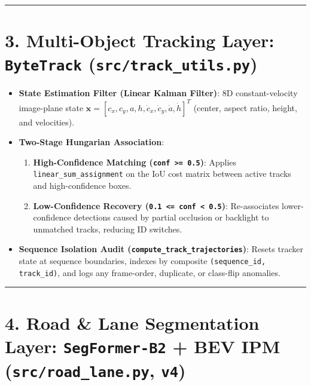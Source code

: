 \documentclass[10.5pt,a4paper]{article}
\begin{document}
\par\noindent\rule{\textwidth}{0.4pt}\par\medskip

\section{3. Multi-Object Tracking Layer: \texttt{ByteTrack} (\texttt{src/\allowbreak{}track\_\allowbreak{}utils.\allowbreak{}py})}

\begin{itemize}[leftmargin=1.5em,itemsep=2pt]
\item \textbf{State Estimation Filter (Linear Kalman Filter)}: 8D constant-velocity image-plane state $\mathbf{x} = [c_x, c_y, a, h, \dot{c}_x, \dot{c}_y, \dot{a}, \dot{h}]^T$ (center, aspect ratio, height, and velocities).
\item \textbf{Two-Stage Hungarian Association}:
\begin{enumerate}[leftmargin=1.8em,itemsep=2pt]
\item \textbf{High-Confidence Matching (\texttt{conf >= 0.\allowbreak{}5})}: Applies \texttt{linear\_\allowbreak{}sum\_\allowbreak{}assignment} on the IoU cost matrix between active tracks and high-confidence boxes.
\item \textbf{Low-Confidence Recovery (\texttt{0.\allowbreak{}1 <= conf < 0.\allowbreak{}5})}: Re-associates lower-confidence detections caused by partial occlusion or backlight to unmatched tracks, reducing ID switches.
\end{enumerate}
\item \textbf{Sequence Isolation Audit (\texttt{compute\_\allowbreak{}track\_\allowbreak{}trajectories})}: Resets tracker state at sequence boundaries, indexes by composite \texttt{(sequence\_\allowbreak{}id,\allowbreak{} track\_\allowbreak{}id)}, and logs any frame-order, duplicate, or class-flip anomalies.
\end{itemize}

\par\noindent\rule{\textwidth}{0.4pt}\par\medskip

\section{4. Road \& Lane Segmentation Layer: \texttt{SegFormer-\allowbreak{}B2} + BEV IPM (\texttt{src/\allowbreak{}road\_\allowbreak{}lane.\allowbreak{}py}, \texttt{v4})}
\end{document}
